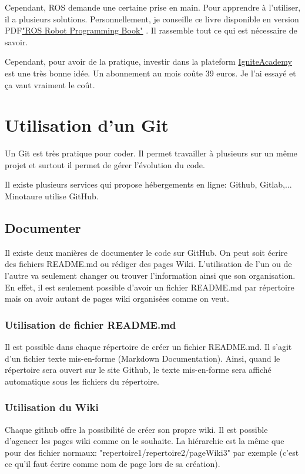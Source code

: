 \documentclass[a4paper, 11pt]{report}
\begin{document}
Cependant, ROS demande une certaine prise en main. Pour apprendre à l'utiliser, il a plusieurs solutions. Personnellement, je conseille ce livre disponible en version PDF\href{https://community.robotsource.org/t/download-the-ros-robot-programming-book-for-free/51}{"ROS Robot Programming Book"} . Il rassemble tout ce qui est nécessaire de savoir.

Cependant, pour avoir de la pratique, investir dans la plateform \href{https://www.robotigniteacademy.com/en/}{IgniteAcademy} est une très bonne idée. Un abonnement au mois coûte 39 euros. Je l'ai essayé et ça vaut vraiment le coût.

\chapter{Utilisation d'un Git}
Un Git est très pratique pour coder. Il permet travailler à plusieurs sur un même projet et surtout il permet de gérer l'évolution du code.

Il existe plusieurs services qui propose hébergements en ligne: Github, Gitlab,... Minotaure utilise GitHub.

\section{Documenter}
Il existe deux manières de documenter le code sur GitHub. On peut soit écrire des fichiers README.md ou rédiger des pages Wiki. L'utilisation de l'un ou de l'autre va seulement changer ou trouver l'information ainsi que son organisation. En effet, il est seulement possible d'avoir un fichier README.md par répertoire mais on avoir autant de pages wiki organisées comme on veut.

\subsection{Utilisation de fichier README.md}
Il est possible dans chaque répertoire de créer un fichier README.md. Il s'agit d'un fichier texte mis-en-forme (Markdown Documentation). Ainsi, quand le répertoire sera ouvert sur le site Github, le texte mis-en-forme sera affiché automatique sous les fichiers du répertoire.


\subsection{Utilisation du Wiki}
Chaque github offre la possibilité de créer son propre wiki. Il est possible d'agencer les pages wiki comme on le souhaite. La hiérarchie est la même que pour des fichier normaux: "repertoire1/repertoire2/pageWiki3" par exemple (c'est ce qu'il faut écrire comme nom de page lors de sa création).
\end{document}

